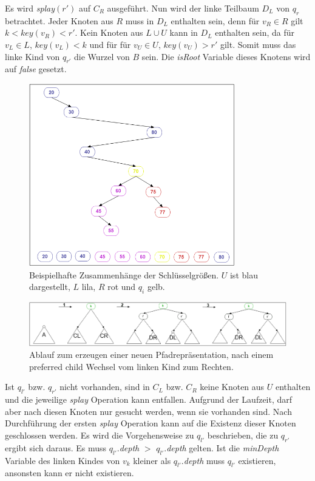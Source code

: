 \documentclass[a4paper,12pt]{article}
\begin{document}
 Es wird \textit{splay}$\left(r'\right)$ auf $C_R$ ausgeführt. Nun wird der linke Teilbaum $D_L$ von $q_r$ betrachtet. Jeder Knoten aus $R$ muss in $D_L$ enthalten sein, denn für $v_R \in R$ gilt $k < \mathit{key}\left(v_R\right) < r'$. Kein Knoten aus $L \cup U$ kann in $D_L$ enthalten sein, da für $v_L \in  L$,  $ \mathit{key}\left(v_L\right) < k$ und für  für $v_U \in  U$,  $ \mathit{key}\left(v_U\right) > r'$ gilt. Somit muss das linke Kind von $q_{r'}$ die Wurzel von $B$ sein. Die \textit{isRoot} Variable dieses Knotens wird auf \textit{false} gesetzt.
\begin{figure}[h]
	\centering
	\includegraphics[width= 0.8\textwidth]{"Medien/Multisplay/keySpace"}
	\caption {Beispielhafte Zusammenhänge der Schlüsselgrößen. $U$ ist blau dargestellt, $L$ lila, $R$ rot und $q_i$ gelb. }
	\label{fig:keySpace}
\end{figure} 
\begin{figure}[h]
	\centering
	\includegraphics[width= 1\textwidth]{"Medien/Multisplay/split"}
	\caption {Ablauf zum erzeugen einer neuen Pfadrepräsentation, nach einem preferred child Wechsel vom linken Kind zum Rechten.}
	\label{fig:split}
\end{figure} 
\noindent Ist $q_{l'}$ bzw. $q_{r'}$ nicht vorhanden, sind in $C_L$ bzw. $C_R$ keine Knoten aus $U$ enthalten und die jeweilige \textit{splay} Operation kann entfallen. Aufgrund der Laufzeit, darf aber nach diesen Knoten nur gesucht werden, wenn sie vorhanden sind. Nach Durchführung der ersten \textit{splay} Operation  kann auf die Existenz dieser Knoten geschlossen werden. Es wird die Vorgehensweise zu  $q_{l'}$ beschrieben, die zu  $q_{r'}$ ergibt sich daraus. Es muss $q_{l'}.$\textit{depth} $>$ $q_{l'}.$\textit{depth} gelten. Ist die \textit{minDepth} Variable des linken Kindes von $v_k$ kleiner als $q_{l'}.$\textit{depth} muss $q_{l'}$ existieren, ansonsten kann er nicht existieren. 
\end{document}
